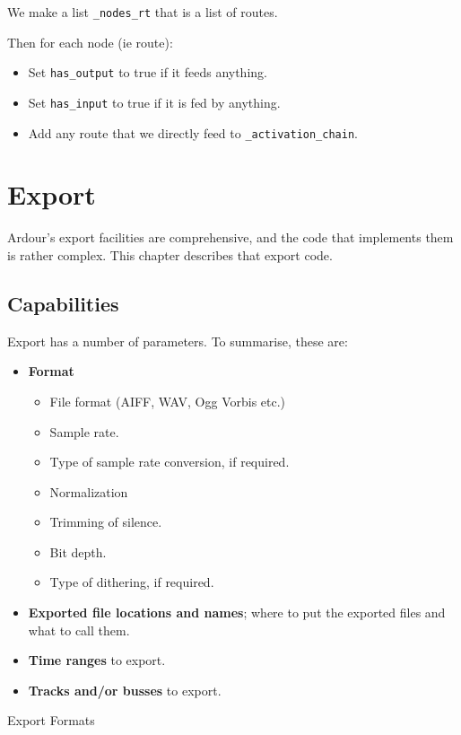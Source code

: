 \documentclass[10pt,a4paper]{book}
\newcommand{\code}[1]{\texttt{#1}}
\begin{document}
We make a list \code{\_nodes\_rt} that is a list of routes.

Then for each node (ie route):

\begin{itemize}
\item Set \code{has\_output} to true if it feeds anything.
\item Set \code{has\_input} to true if it is fed by anything.
\item Add any route that we directly feed to \code{\_activation\_chain}.
\end{itemize}

\chapter{Export}

Ardour's export facilities are comprehensive, and the code that
implements them is rather complex.  This chapter describes that export code.

\section{Capabilities}

Export has a number of parameters.  To summarise, these are:

\begin{itemize}
\item \textbf{Format}
  \begin{itemize}
  \item File format (AIFF, WAV, Ogg Vorbis etc.)
  \item Sample rate.
  \item Type of sample rate conversion, if required.
  \item Normalization
  \item Trimming of silence.
  \item Bit depth.
  \item Type of dithering, if required.
  \end{itemize}
\item \textbf{Exported file locations and names}; where to put the exported files and what to call them.
\item \textbf{Time ranges} to export.
\item \textbf{Tracks and/or busses} to export.
\end{itemize}



Export Formats
\end{document}
